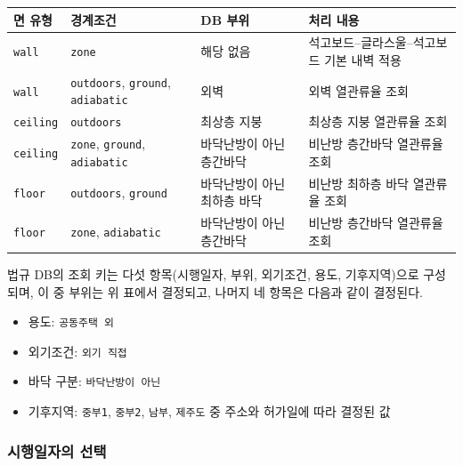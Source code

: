 \begin{defaulttable}
  \caption{\texttt{unknown} 면의 법규 DB 부위 결정}
  \label{tbl:unknown-surface-part-mapping}
  {\small
  \begin{tabularx}{\textwidth}{lllX}
    \toprule
    면 유형 & 경계조건 & DB 부위 & 처리 내용 \\ \midrule
    \texttt{wall}
      & \texttt{zone}
      & 해당 없음
      & 석고보드--글라스울--석고보드 기본 내벽 적용 \\

    \texttt{wall}
      & \texttt{outdoors}, \texttt{ground}, \texttt{adiabatic}
      & 외벽
      & 외벽 열관류율 조회 \\

    \texttt{ceiling}
      & \texttt{outdoors}
      & 최상층 지붕
      & 최상층 지붕 열관류율 조회 \\

    \texttt{ceiling}
      & \texttt{zone}, \texttt{ground}, \texttt{adiabatic}
      & 바닥난방이 아닌 층간바닥
      & 비난방 층간바닥 열관류율 조회 \\

    \texttt{floor}
      & \texttt{outdoors}, \texttt{ground}
      & 바닥난방이 아닌 최하층 바닥
      & 비난방 최하층 바닥 열관류율 조회 \\

    \texttt{floor}
      & \texttt{zone}, \texttt{adiabatic}
      & 바닥난방이 아닌 층간바닥
      & 비난방 층간바닥 열관류율 조회 \\
    \bottomrule
  \end{tabularx}
  }
\end{defaulttable}

법규 DB의 조회 키는 다섯 항목(시행일자, 부위, 외기조건, 용도, 기후지역)으로 구성되며, 이 중 부위는 위 표에서 결정되고, 나머지 네 항목은 다음과 같이 결정된다.

\begin{itemize}
  \item 용도: \texttt{공동주택 외}
  \item 외기조건: \texttt{외기 직접}
  \item 바닥 구분: \texttt{바닥난방이 아닌}
  \item 기후지역: \texttt{중부1}, \texttt{중부2}, \texttt{남부}, \texttt{제주도} 중 주소와 허가일에 따라 결정된 값
\end{itemize}

\subsubsection{시행일자의 선택}

